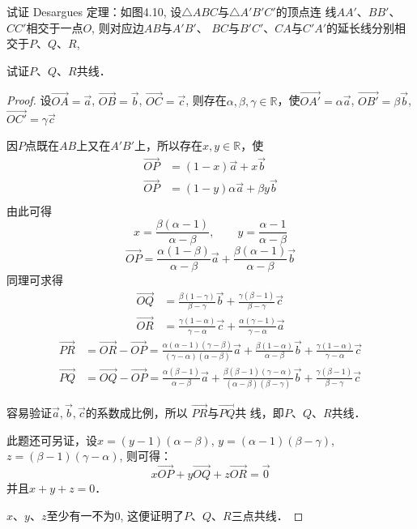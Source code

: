 \begin{example}
    试证 Desargues 定理：如图4.10, 设$\triangle ABC$与$\triangle A'B'C'$的顶点连
    线$AA'$、$BB'$、$CC'$相交于一点$O$, 则对应边$AB$与$A'B'$、
    $BC$与$B'C'$、$CA$与$C'A'$的延长线分别相交于$P$、$Q$、$R$, 
    
    试证$P$、$Q$、$R$共线．
\end{example}

\begin{proof}
    设$\Vec{OA}=\vec{a}$, $\Vec{OB}=\vec{b}$, $\Vec{OC}=\vec{c}$, 则存在$\alpha,\beta,\gamma\in \mathbb{R}$，使$\Vec{OA'}=\alpha\vec{a}$, $\Vec{OB'}=\beta\vec{b}$, $\Vec{OC'}=\gamma\vec{c}$

    因$P$点既在$AB$上又在$A'B'$上，所以存在$x,y\in\mathbb{R}$，使
\[\begin{split}
    \Vec{OP}&=(1-x)\vec{a}+x\vec{b}\\
    \Vec{OP}&=(1-y)\alpha\vec{a}+\beta y\vec{b}\\
\end{split}\]
由此可得
\[x=\frac{\beta(\alpha-1)}{\alpha-\beta},\qquad y=\frac{\alpha-1}{\alpha-\beta}\]
\begin{equation}
    \Vec{OP}=\frac{\alpha(1-\beta)}{\alpha-\beta}\vec{a}+\frac{\beta(\alpha-1)}{\alpha-\beta}\vec{b}
\end{equation}
同理可求得
\begin{align}
    \Vec{OQ}&=\frac{\beta(1-\gamma)}{\beta-\gamma}\vec{b}+\frac{\gamma(\beta-1)}{\beta-\gamma}\vec{c}\\
    \Vec{OR}&=\frac{\gamma(1-\alpha)}{\gamma-\alpha}\vec{c}+\frac{\alpha(\gamma-1)}{\gamma-\alpha}\vec{a}
\end{align}
\[\begin{split}
    \Vec{PR}&=\Vec{OR}-\Vec{OP}=\frac{\alpha(\alpha-1)(\gamma-\beta)}{(\gamma-\alpha)(\alpha-\beta)}\vec{a}+\frac{\beta(1-\alpha)}{\alpha-\beta}\vec{b}+\frac{\gamma(1-\alpha)}{\gamma-\alpha}\vec{c}\\
    \Vec{PQ}&=\Vec{OQ}-\Vec{OP}=\frac{\alpha(\beta-1)}{\alpha-\beta}\vec{a}+\frac{\beta(\beta-1)(\gamma-\alpha)}{(\alpha-\beta)(\beta-\gamma)}\vec{b}+\frac{\gamma(\beta-1)}{\beta-\gamma}\vec{c}
\end{split}\]

容易验证$\vec{a},\vec{b},\vec{c}$的系数成比例，所以
$\Vec{PR}$与$\Vec{PQ}$共
线，即$P$、$Q$、$R$共线．

此题还可另证，设$x=(y-1)(\alpha-\beta)$,
 $y=(\alpha-1)(\beta-\gamma)$, $z=(\beta-1)(\gamma-\alpha)$, 则可得：
\[x\Vec{OP}+y\Vec{OQ}+z\Vec{OR}=\vec{0}\]
并且$x+y+z=0$．

$x$、$y$、$z$至少有一不为0, 
这便证明了$P$、$Q$、$R$三点共线．
\end{proof}

